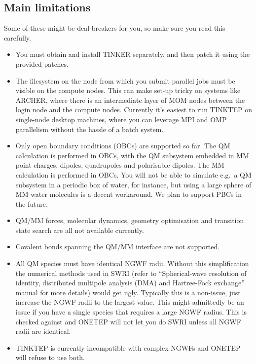 \documentclass[letterpaper,10pt,english]{sphinxmanual}
\begin{document}
\subsection{Main limitations}
\label{\detokenize{tinktep:main-limitations}}
Some of these might be deal-breakers for you, so make sure you read this
carefully.
\begin{itemize}
\item {} 
You must obtain and install TINKER separately, and then patch it
using the provided patches.

\item {} 
The filesystem on the node from which you submit parallel jobs must
be visible on the compute nodes. This can make set-up tricky on
systems like ARCHER, where there is an intermediate layer of MOM
nodes between the login node and the compute nodes. Currently it’s
easiest to run TINKTEP on single-node desktop machines, where you can
leverage MPI and OMP parallelism without the hassle of a batch
system.

\item {} 
Only open boundary conditions (OBCs) are supported so far. The QM
calculation is performed in OBCs, with the QM subsystem embedded in
MM point charges, dipoles, quadrupoles and polarisable dipoles. The
MM calculation is performed in OBCs. You will not be able to simulate
e.g. a QM subsystem in a periodic box of water, for instance, but
using a large sphere of MM water molecules is a decent workaround. We
plan to support PBCs in the future.

\item {} 
QM/MM forces, molecular dynamics, geometry optimisation and
transition state search are all not available currently.

\item {} 
Covalent bonds spanning the QM/MM interface are not supported.

\item {} 
All QM species must have identical NGWF radii. Without this
simplification the numerical methods used in SWRI (refer to
“Spherical-wave resolution of identity, distributed multipole
analysis (DMA) and Hartree-Fock exchange” manual for more details)
would get ugly. Typically this is a non-issue, just increase the NGWF
radii to the largest value. This might admittedly be an issue if you
have a single species that requires a large NGWF radius. This is
checked against and ONETEP will not let you do SWRI unless all NGWF
radii are identical.

\item {} 
TINKTEP is currently incompatible with complex NGWFs and ONETEP will
refuse to use both.


\end{itemize}
\end{document}
